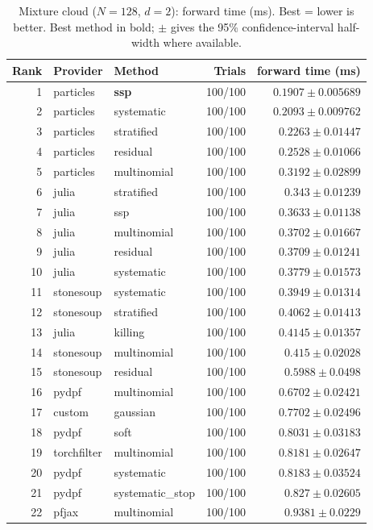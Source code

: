 \begin{table}[!htbp]
\centering
\small
\caption{Mixture cloud ($N=128$, $d=2$): forward time (ms). Best = lower is better. Best method in bold; $\pm$ gives the 95\% confidence-interval half-width where available.}
\label{tab:mixture-cloud-forward-ms}
\begin{tabular}{rllrr}
\toprule
Rank & Provider & Method & Trials & forward time (ms) \\
\midrule
1 & particles & \textbf{ssp} & 100/100 & $\mathbf{0.1907 \pm 0.005689}$ \\
2 & particles & systematic & 100/100 & $0.2093 \pm 0.009762$ \\
3 & particles & stratified & 100/100 & $0.2263 \pm 0.01447$ \\
4 & particles & residual & 100/100 & $0.2528 \pm 0.01066$ \\
5 & particles & multinomial & 100/100 & $0.3192 \pm 0.02899$ \\
6 & julia & stratified & 100/100 & $0.343 \pm 0.01239$ \\
7 & julia & ssp & 100/100 & $0.3633 \pm 0.01138$ \\
8 & julia & multinomial & 100/100 & $0.3702 \pm 0.01667$ \\
9 & julia & residual & 100/100 & $0.3709 \pm 0.01241$ \\
10 & julia & systematic & 100/100 & $0.3779 \pm 0.01573$ \\
11 & stonesoup & systematic & 100/100 & $0.3949 \pm 0.01314$ \\
12 & stonesoup & stratified & 100/100 & $0.4062 \pm 0.01413$ \\
13 & julia & killing & 100/100 & $0.4145 \pm 0.01357$ \\
14 & stonesoup & multinomial & 100/100 & $0.415 \pm 0.02028$ \\
15 & stonesoup & residual & 100/100 & $0.5988 \pm 0.0498$ \\
16 & pydpf & multinomial & 100/100 & $0.6702 \pm 0.02421$ \\
17 & custom & gaussian & 100/100 & $0.7702 \pm 0.02496$ \\
18 & pydpf & soft & 100/100 & $0.8031 \pm 0.03183$ \\
19 & torchfilter & multinomial & 100/100 & $0.8181 \pm 0.02647$ \\
20 & pydpf & systematic & 100/100 & $0.8183 \pm 0.03524$ \\
21 & pydpf & systematic\_stop & 100/100 & $0.827 \pm 0.02605$ \\
22 & pfjax & multinomial & 100/100 & $0.9381 \pm 0.0229$ \\

\end{tabular}
\end{table}
